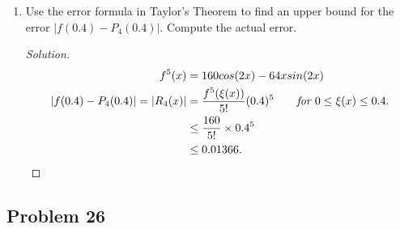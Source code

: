 \documentclass{article}
\begin{document}
\begin{enumerate}[label=(\alph*)]
    \item Use the error formula in Taylor's Theorem to find an upper bound for the error
    $|f(0.4) - P_4(0.4)|$. Compute the actual error.

    \begin{proof}[Solution]
        \begin{align*}
            f^5(x) & = 160cos(2x) - 64xsin(2x) \\
            |f(0.4) - P_4(0.4)| = |R_4(x)| & = \frac{f^5(\xi(x))}{5!}(0.4)^5 \qquad 
            \emph{for } 0 \le \xi(x) \le 0.4. \\
            & \le \frac{160}{5!}\times 0.4^5 \\
            & \le 0.01366.
        \end{align*}
    \end{proof}
\end{enumerate}

\subsection*{Problem 26} 
\end{document}
